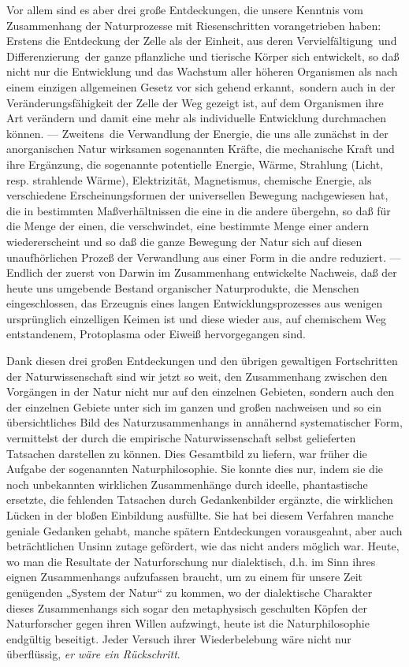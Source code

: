 Vor allem sind es aber drei große Entdeckungen, die unsere
Kenntnis vom Zusammenhang der Naturprozesse mit Riesenschritten
vorangetrieben haben: Erstens die Entdeckung der Zelle als der Einheit,
aus deren Vervielfältigung \textbar{}\,und Differenzierung\,\textbar{} der ganze pflanzliche
und tierische Körper sich entwickelt, so daß nicht nur die Entwicklung
und das Wachstum aller höheren Organismen als nach einem einzigen
allgemeinen Gesetz vor sich gehend erkannt, \textbar{}\,sondern auch in der
Veränderungsfähigkeit der Zelle
der Weg gezeigt ist, auf dem
Organismen ihre Art verändern und damit eine mehr als individuelle
Entwicklung durchmachen können. --- Zweitens\,\textbar{} die Verwandlung der
Energie, die uns alle zunächst in der anorganischen Natur wirksamen
sogenannten Kräfte, die mechanische Kraft und ihre Ergänzung, die
sogenannte potentielle Energie, Wärme, Strahlung (Licht, resp.
strahlende Wärme), Elektrizität, Magnetismus, chemische Energie, als
verschiedene Erscheinungsformen der universellen Bewegung nachgewiesen
hat, die in bestimmten Maßverhältnissen die eine in die andere übergehn,
so daß für die Menge der einen, die verschwindet, eine bestimmte Menge
einer andern wiedererscheint und so daß die ganze Bewegung der Natur
sich auf diesen unaufhörlichen Prozeß der Verwandlung aus einer Form in
die andre reduziert. --- Endlich der zuerst von Darwin im Zusammenhang
entwickelte Nachweis, daß der heute uns umgebende Bestand organischer
Naturprodukte, die Menschen eingeschlossen, das Erzeugnis eines langen
Entwicklungsprozesses aus wenigen ursprünglich einzelligen Keimen ist
und diese wieder aus, auf chemischem Weg entstandenem, Protoplasma oder
Eiweiß hervorgegangen sind.

Dank diesen drei großen Entdeckungen und den übrigen gewaltigen
Fortschritten der Naturwissenschaft sind wir jetzt so weit, den
Zusammenhang zwischen den Vorgängen in der Natur nicht nur auf den
einzelnen Gebieten, sondern auch den der einzelnen Gebiete unter sich im
ganzen und großen nachweisen und so ein übersichtliches Bild des
Naturzusammenhangs in annähernd systematischer Form, vermittelst der
durch die empirische Naturwissenschaft selbst gelieferten Tatsachen
darstellen zu können. Dies Gesamtbild zu liefern, war früher die Aufgabe
der sogenannten Naturphilosophie. Sie konnte dies nur, indem sie die
noch unbekannten wirklichen Zusammenhänge durch ideelle, phantastische
ersetzte, die fehlenden Tatsachen durch Gedankenbilder ergänzte, die
wirklichen Lücken in der bloßen Einbildung ausfüllte. Sie hat bei diesem
Verfahren manche geniale Gedanken gehabt, manche spätern Entdeckungen
vorausgeahnt, aber auch beträchtlichen Unsinn zutage gefördert, wie das
nicht anders möglich war. Heute, wo man die Resultate der Naturforschung
nur dialektisch, d.h. im Sinn ihres eignen Zusammenhangs aufzufassen
braucht, um zu einem für unsere Zeit genügenden „System der Natur`` zu
kommen, wo der dialektische Charakter dieses Zusammenhangs sich sogar
den metaphysisch geschulten Köpfen der Naturforscher gegen ihren Willen
aufzwingt, heute ist die Naturphilosophie endgültig beseitigt. Jeder
Versuch ihrer Wiederbelebung wäre nicht nur überflüssig, \emph{er wäre
ein Rückschritt}.

